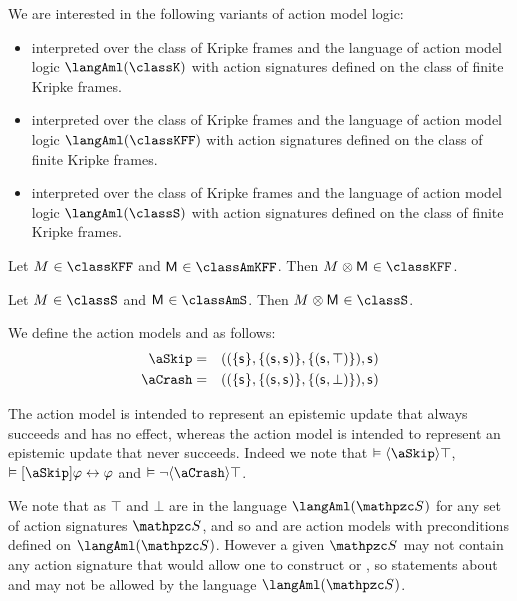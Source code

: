 We are interested in the following variants of action model logic:
\begin{itemize}
    \item \logicAmlK{} interpreted over the class of \classK{} Kripke frames and the language of action model logic $\langAml(\classK)$ with action signatures defined on the class of finite \classK{} Kripke frames.
    \item \logicAmlKFF{} interpreted over the class of \classKFF{} Kripke frames and the language of action model logic $\langAml(\classKFF)$ with action signatures defined on the class of finite \classKFF{} Kripke frames.
    \item \logicAmlS{} interpreted over the class of \classS{} Kripke frames and the language of action model logic $\langAml(\classS)$ with action signatures defined on the class of finite \classS{} Kripke frames.
\end{itemize}

\begin{proposition}
    Let $\kModel \in \classKFF$ and $\aModel \in \classAmKFF$. Then $\kModel \exec \aModel \in \classKFF$.
\end{proposition}

\begin{proposition}
    Let $\kModel \in \classS$ and $\aModel \in \classAmS$. Then $\kModel \exec \aModel \in \classS$.
\end{proposition}

\begin{definition}
    We define the action models \aSkip{} and \aCrash{} as follows:
    \begin{eqnarray*}
        \aSkip &=& ((\{\aStateS\}, \{(\aStateS, \aStateS)\}, \{(\aStateS, \top)\}), \aStateS)\\
        \aCrash &=& ((\{\aStateS\}, \{(\aStateS, \aStateS)\}, \{(\aStateS, \bot)\}), \aStateS)
    \end{eqnarray*}
\end{definition}

The action model \aSkip{} is intended to represent an epistemic update that always succeeds and has no effect,
whereas the action model \aCrash{} is intended to represent an epistemic update that never succeeds.
Indeed we note that $\entails \actionE{\aSkip} \top$, $\entails \actionA{\aSkip} \phi \iff \phi$ and $\entails \lnot \actionE{\aCrash} \top$.

We note that as $\top$ and $\bot$ are in the language $\langAml(\aSignatureFamily)$ for any set of action signatures $\aSignatureFamily$, and so \aSkip{} and \aCrash{} are action models with preconditions defined on $\langAml(\aSignatureFamily)$.
However a given $\aSignatureFamily$ may not contain any action signature that would allow one to construct \aSkip{} or \aCrash{}, so statements about \aSkip{} and \aCrash{} may not be allowed by the language $\langAml(\aSignatureFamily)$.

